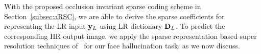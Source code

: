 {

With the proposed occlusion invariant sparse coding scheme in Section~\ref{subsec:aRSC}, we are able to derive the sparse coefficients for representing the LR input $\mathbf{y}_L$ using LR dictionary $\mathbf{D}_L$. To predict the corresponding HR output image, we apply the sparse representation based super resolution techniques of~\cite{TIP10,convex} for our face hallucination task, as we now discuss.

}
